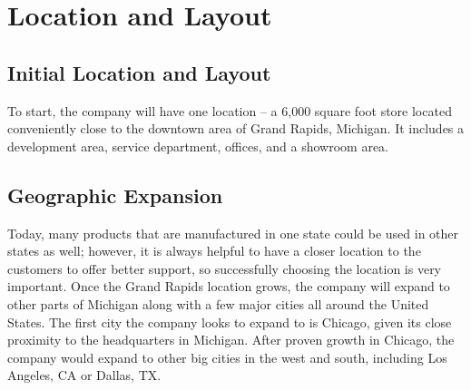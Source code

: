 \section{Location and Layout}
\subsection{Initial Location and Layout}
To start, the company will have one location -- a 6,000 square foot store located conveniently close to the downtown area of Grand Rapids, Michigan. It includes a development area, service department, offices, and a showroom area.  

\subsection{Geographic Expansion}
Today, many products that are manufactured in one state could be used in other states as well; however, it is always helpful to have a closer location to the customers to offer better support, so successfully choosing the location is very important. Once the Grand Rapids location grows, the company will expand to other parts of Michigan along with a few major cities all around the United States. The first city the company looks to expand to is Chicago, given its close proximity to the headquarters in Michigan. After proven growth in Chicago, the company would expand to other big cities in the west and south, including Los Angeles, CA or Dallas, TX. 

              